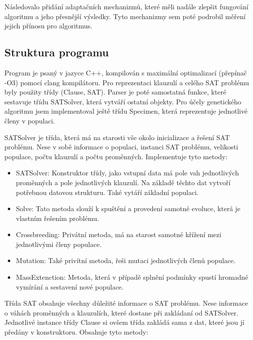 \documentclass{article}
\begin{document}
    Následovalo přidání adaptačních mechanizmů, které měli nadále zlepšit fungování algoritmu a jeho přesnější výsledky. Tyto mechanizmy sem poté podrobil měření jejich přínosu
    pro algoritmus.

    \subsection{Struktura programu}

    Program je psaný v jazyce C++, kompilován s maximální optimalizací (přepínač -O3) pomocí clang kompilátoru. Pro reprezentaci klauzulí a celého SAT problému byly
    použity třídy (Clause, SAT). Parser je poté samostatná funkce, které sestavuje třídu SATSolver, která vytváří ostatní objekty. Pro účely genetického algoritmu
    jsem implementoval ještě třídu Specimen, která reprezentuje jednotlivé členy v populaci.

    SATSolver je třída, která má na starosti vše okolo inicializace a řešení SAT problému. Nese v sobě informace o populaci, instanci SAT problému, velikosti populace,
    počtu klauzulí a počtu proměnných. Implementuje tyto metody:

    \begin{itemize}
        \item {SATSolver: Konstruktor třídy, jako vstupní data má pole vah jednotlivých proměnných a pole jednotlivých klauzulí. Na základě těchto dat vytvoří potřebnou
                datovou strukturu. Také vytáří základní populaci.}
        \item {Solve: Tato metoda slouží k spuštění a provedení samotné evoluce, která je vlastním řešením problému.}
        \item {Crossbreeding: Privátní metoda, má na starost samotné křížení mezi jednotlivými členy populace.}
        \item {Mutation: Také privítní metoda, řeši mutaci jednotlivých členů populace.}
        \item {MassExtenction: Metoda, která v případě splnění podmínky spustí hromadné vymírání a sestavení nové populace.}
    \end{itemize}

    Třída SAT obsahuje všechny důležité informace o SAT problému. Nese informace o váhách proměnných a klauzulích, které dostane při zakládaní od SATSolver. Jednotlivé instance
    třídy Clause si ovšem třída zakládá sama z dat, které jsou jí předány v konstruktoru. Obsahuje tyto metody:
\end{document}
